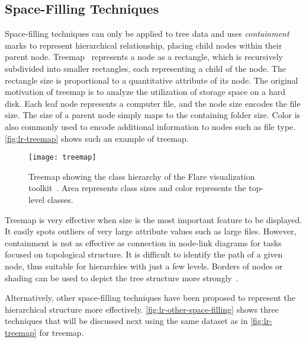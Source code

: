 \subsection{Space-Filling Techniques}
Space-filling techniques can only be applied to tree data and uses \emph{containment} marks to represent hierarchical relationship, placing child nodes within their parent node. Treemap~\cite{Shneiderman1992} represents a node as a rectangle, which is recursively subdivided into smaller rectangles, each representing a child of the node. The rectangle size is proportional to a quantitative attribute of its node. The original motivation of treemap is to analyze the utilization of storage space on a hard disk. Each leaf node represents a computer file, and the node size encodes the file size. The size of a parent node simply maps to the containing folder size. Color is also commonly used to encode additional information to nodes such as file type. \autoref{fig:lr-treemap} shows such an example of treemap.

\begin{figure}[!htb]
	\centering
	\texttt{[image: treemap]}
	\caption[Treemap]{Treemap showing the class hierarchy of the Flare visualization toolkit~\cite{Heer2009b}. Area represents class sizes and color represents the top-level classes.}
	\label{fig:lr-treemap}
\end{figure}

Treemap is very effective when size is the most important feature to be displayed. It easily spots outliers of very large attribute values such as large files. However, containment is not as effective as connection in node-link diagrams for tasks focused on topological structure. It is difficult to identify the path of a given node, thus suitable for hierarchies with just a few levels. Borders of nodes or shading can be used to depict the tree structure more strongly~\cite{Wijk1999}.

Alternatively, other space-filling techniques have been proposed to represent the hierarchical structure more effectively. \autoref{fig:lr-other-space-filling} shows three techniques that will be discussed next using the same dataset as in \autoref{fig:lr-treemap} for treemap. 

